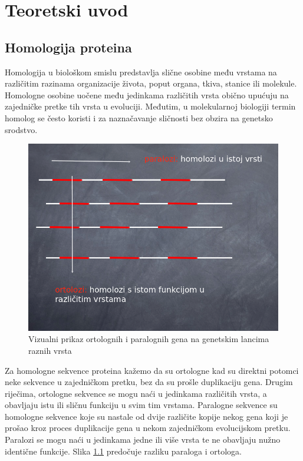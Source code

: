 \chapter{Teoretski uvod}
\label{chap:teoretski-uvod}

\section{Homologija proteina}
\label{sec:homologija}

Homologija u biološkom smislu predstavlja slične osobine među vrstama na
različitim razinama organizacije života, poput organa, tkiva, stanice ili
molekule. Homologne osobine uočene među jedinkama različitih vrsta obično
upućuju na zajedničke pretke tih vrsta u evoluciji. Međutim, u molekularnoj
biologiji termin homolog se često koristi i za naznačavanje sličnosti bez
obzira na genetsko srodstvo.\cite{bioinfo1}

\begin{figure}[h!]
\centering
\includegraphics[width=4.5in]{figures/ortho-para.png}
\caption{Vizualni prikaz ortolognih i paralognih gena na genetskim lancima
raznih vrsta}
\label{fig:para-ortho}
\end{figure}

Za homologne sekvence proteina kažemo da su ortologne kad su direktni
potomci neke sekvence u zajedničkom pretku, bez da su prošle duplikaciju
gena. Drugim riječima, ortologne sekvence se mogu naći u jedinkama
različitih vrsta, a obavljaju istu ili sličnu funkciju u svim tim vrstama.
Paralogne sekvence su homologne sekvence koje su nastale od dvije različite
kopije nekog gena koji je prošao kroz proces duplikacije gena u nekom
zajedničkom evolucijskom pretku. Paralozi se mogu naći u jedinkama jedne ili
više vrsta te ne obavljaju nužno identične funkcije. Slika \ref{fig:para-ortho}
predočuje razliku paraloga i ortologa.


